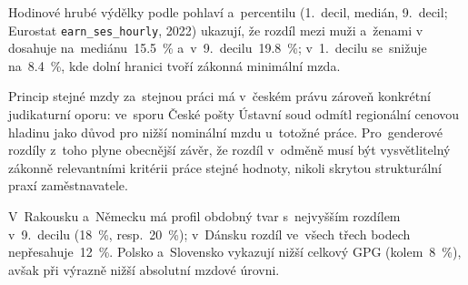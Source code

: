 Hodinové hrubé výdělky podle pohlaví a~percentilu (1.~decil, medián, 9.~decil; Eurostat \texttt{earn\_ses\_hourly}, 2022) ukazují, že rozdíl mezi muži a~ženami v~ dosahuje na~mediánu~\SI{15,5}{\percent} a~v~9.~decilu~\SI{19,8}{\percent}; v~1.~decilu se~snižuje na~\SI{8,4}{\percent}, kde dolní hranici tvoří zákonná minimální mzda.

Princip stejné mzdy za~stejnou práci má v~českém právu zároveň konkrétní judikaturní oporu: ve~sporu České pošty Ústavní soud odmítl regionální cenovou hladinu jako důvod pro nižší nominální mzdu u~totožné práce. Pro~genderové rozdíly z~toho plyne obecnější závěr, že rozdíl v~odměně musí být vysvětlitelný zákonně relevantními kritérii práce stejné hodnoty, nikoli skrytou strukturální praxí zaměstnavatele.~\cite{uscr_i_us_2820_20}

V~Rakousku a~Německu má profil obdobný tvar s~nejvyšším rozdílem v~9.~decilu (\SI{18}{\percent}, resp.~\SI{20}{\percent}); v~Dánsku rozdíl ve~všech třech bodech nepřesahuje~\SI{12}{\percent}. Polsko a~Slovensko vykazují nižší celkový \ac{GPG} (kolem~\SI{8}{\percent}), avšak při výrazně nižší absolutní mzdové úrovni.


